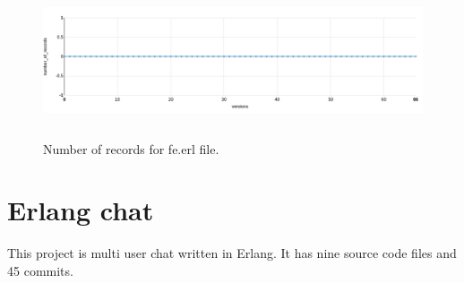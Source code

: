 \begin{figure}[h]
	\centering
	\includegraphics[height=45mm]{figures/number_of_records_iron.png}
	\caption{Number of records for fe.erl file.}
	\label{fig:number_of_records_iron}
\end{figure}

\section{Erlang chat }

This project is multi user chat written in Erlang. It has nine source code files and 45 commits.
